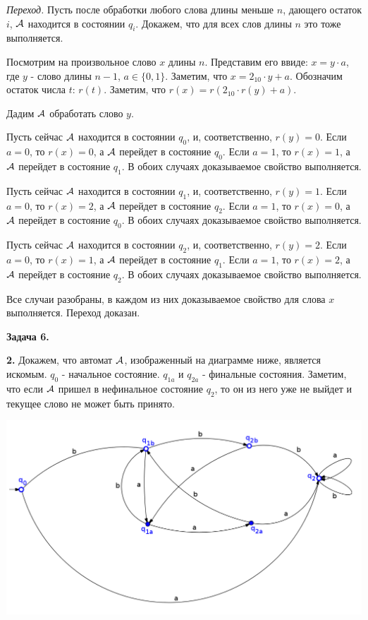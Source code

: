\documentclass[10pt]{article}
\begin{document}
{\em Переход.}
Пусть после обработки любого слова длины меньше $n$, дающего остаток $i$, ${\cal A}$ находится в состоянии $q_i$. Докажем, что для всех слов длины $n$ это тоже выполняется.

Посмотрим на произвольное слово $x$ длины $n$. Представим его ввиде: $x = y \cdot a$, где $y$ - слово длины $n - 1$, $a \in \{ 0, 1 \}$. Заметим, что $x = 2_{10} \cdot y + a$. Обозначим остаток числа $t$: $r(t)$. Заметим, что $r(x) = r(2_{10} \cdot r(y) + a)$.

Дадим ${\cal A}$ обработать слово $y$.

Пусть сейчас ${\cal A}$ находится в состоянии $q_0$, и, соответственно, $r(y) = 0$. Если $a = 0$, то $r(x) = 0$, а ${\cal A}$ перейдет в состояние $q_0$. Если $a = 1$, то $r(x) = 1$, а ${\cal A}$ перейдет в состояние $q_1$. В обоих случаях доказываемое свойство выполняется.

Пусть сейчас ${\cal A}$ находится в состоянии $q_1$, и, соответственно, $r(y) = 1$. Если $a = 0$, то $r(x) = 2$, а ${\cal A}$ перейдет в состояние $q_2$. Если $a = 1$, то $r(x) = 0$, а ${\cal A}$ перейдет в состояние $q_0$. В обоих случаях доказываемое свойство выполняется.

Пусть сейчас ${\cal A}$ находится в состоянии $q_2$, и, соответственно, $r(y) = 2$. Если $a = 0$, то $r(x) = 1$, а ${\cal A}$ перейдет в состояние $q_1$. Если $a = 1$, то $r(x) = 2$, а ${\cal A}$ перейдет в состояние $q_2$. В обоих случаях доказываемое свойство выполняется.

Все случаи разобраны, в каждом из них доказываемое свойство для слова $x$ выполняется. Переход доказан. 

\medskip

{\bf Задача 6.}

{\bf 2.}
Докажем, что автомат ${\cal A}$, изображенный на диаграмме ниже, является искомым. $q_0$ - начальное состояние. $q_{1a}$ и $q_{2a}$ - финальные состояния. Заметим, что если ${\cal A}$ пришел в нефинальное состояние $q_2$, то он из него уже не выйдет и текущее слово не может быть принято.

\noindent \includegraphics[width=\textwidth]{alpha.png}
\end{document}
